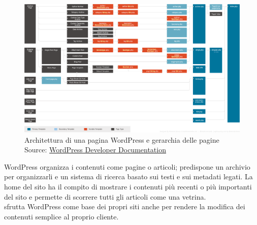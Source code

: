    \begin{figure}[H]
      \begin{center}
         \includegraphics[width=16.5cm,keepaspectratio]{immagini/template-hierarchy}
         \caption[Architettura di una pagina WordPress e gerarchia delle pagine]{Architettura di una pagina WordPress e gerarchia delle pagine
         \\
         Source: \href{https://developer.wordpress.org/themes/basics/template-hierarchy/}{WordPress Developer Documentation}}
      \end{center}
   \end{figure}
   WordPress organizza i contenuti come pagine o articoli; predispone un archivio per organizzarli e un sistema di ricerca basato sui testi e sui metadati legati. La home del sito ha il compito di mostrare i contenuti più recenti o più importanti del sito e permette di scorrere tutti gli articoli come una vetrina.
   \\
   \nomeAzienda{} sfrutta WordPress come base dei propri siti anche per rendere la modifica dei contenuti semplice al proprio cliente.

